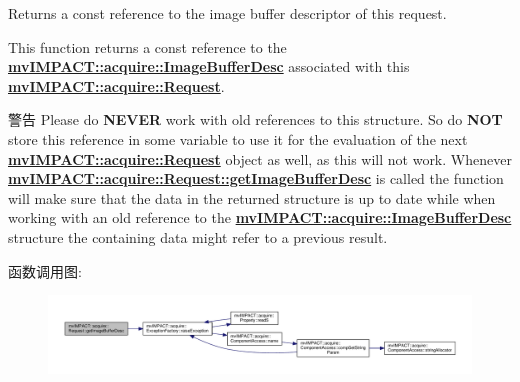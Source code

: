 Returns a const reference to the image buffer descriptor of this request. 

This function returns a const reference to the {\bfseries \hyperlink{classmv_i_m_p_a_c_t_1_1acquire_1_1_image_buffer_desc}{mv\+I\+M\+P\+A\+C\+T\+::acquire\+::\+Image\+Buffer\+Desc}} associated with this {\bfseries \hyperlink{classmv_i_m_p_a_c_t_1_1acquire_1_1_request}{mv\+I\+M\+P\+A\+C\+T\+::acquire\+::\+Request}}.

\begin{DoxyWarning}{警告}
Please do {\bfseries N\+E\+V\+E\+R} work with old references to this structure. So do {\bfseries N\+O\+T} store this reference in some variable to use it for the evaluation of the next {\bfseries \hyperlink{classmv_i_m_p_a_c_t_1_1acquire_1_1_request}{mv\+I\+M\+P\+A\+C\+T\+::acquire\+::\+Request}} object as well, as this will not work. Whenever {\bfseries \hyperlink{classmv_i_m_p_a_c_t_1_1acquire_1_1_request_a76ee1fe02ab7a1fcd5f894a317353f39}{mv\+I\+M\+P\+A\+C\+T\+::acquire\+::\+Request\+::get\+Image\+Buffer\+Desc}} is called the function will make sure that the data in the returned structure is up to date while when working with an old reference to the {\bfseries \hyperlink{classmv_i_m_p_a_c_t_1_1acquire_1_1_image_buffer_desc}{mv\+I\+M\+P\+A\+C\+T\+::acquire\+::\+Image\+Buffer\+Desc}} structure the containing data might refer to a previous result. 
\end{DoxyWarning}


函数调用图\+:
\nopagebreak
\begin{figure}[H]
\begin{center}
\leavevmode
\includegraphics[width=350pt]{classmv_i_m_p_a_c_t_1_1acquire_1_1_request_a76ee1fe02ab7a1fcd5f894a317353f39_cgraph}
\end{center}
\end{figure}


